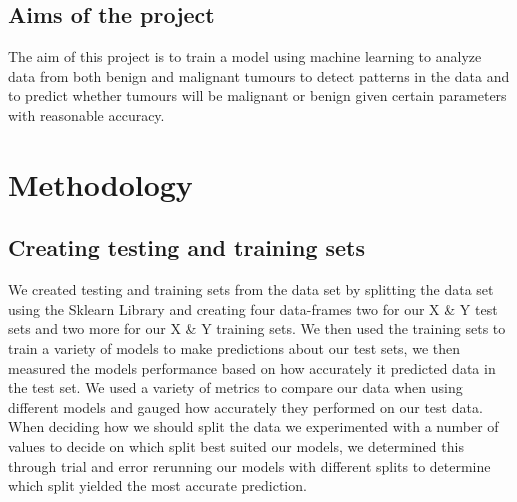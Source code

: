 \documentclass[conference]{IEEEtran}
\begin{document}
\subsection{Aims of the project}
 The aim of this project is to train a model using machine learning to analyze data from both benign and malignant tumours to detect patterns in the data and to predict whether tumours will be malignant or benign given certain parameters with reasonable accuracy.
\section{Methodology}
\subsection{Creating testing and training sets}
We created testing and training sets from the data set by splitting the data set using the Sklearn Library\cite{sklearn} and creating four data-frames two for our X \& Y test sets and two more for our X \& Y training sets.  We then used the training sets to train a variety of models to make predictions about our test sets, we then measured the models performance based on how accurately it predicted data in the test set.  We used a variety of metrics to compare our data when using different models and gauged how accurately they performed on our test data.  When deciding how we should split the data we experimented with a number of values to decide on which split best suited our models, we determined this through trial and error rerunning our models with different splits to determine which split yielded the most accurate prediction.  
\end{document}
